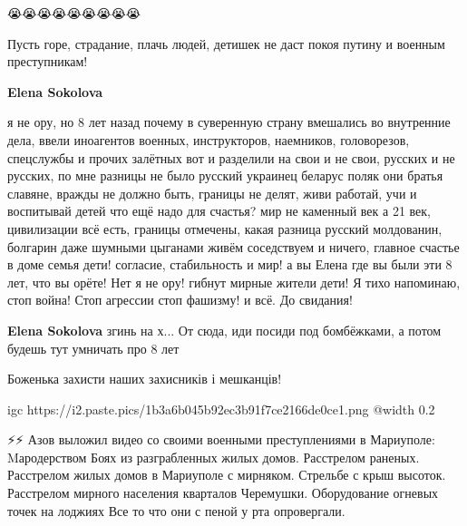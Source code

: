 😭😭😭😭😭😭😭😭😭


Пусть горе, страдание, плачь людей, детишек не даст покоя путину и военным преступникам!

\begin{itemize} %
\textbf{Elena Sokolova} 

я не ору, но 8 лет назад почему в суверенную страну вмешались во внутренние
дела, ввели иноагентов военных, инструкторов, наемников, головорезов,
спецслужбы и прочих залётных вот и разделили на свои и не свои, русских и не
русских, по мне разницы не было русский украинец беларус поляк они братья
славяне, вражды не должно быть, границы не делят, живи работай, учи и
воспитывай детей что ещё надо для счастья? мир не каменный век а 21 век,
цивилизации всё есть, границы отмечены, какая разница русский молдованин,
болгарин даже шумными цыганами живём соседствуем и ничего, главное счастье в
доме семья дети! согласие, стабильность и мир! а вы Елена где вы были эти 8
лет, что вы орёте! Нет я не ору! гибнут мирные жители дети! Я тихо напоминаю,
стоп война! Стоп агрессии стоп фашизму! и всё. До свидания!

\textbf{Elena Sokolova} згинь на х... От сюда, иди посиди под бомбёжками, а потом будешь тут умничать про 8 лет
\end{itemize} %


Боженька захисти наших захисників і мешканців!

\ifcmt
  igc https://i2.paste.pics/1b3a6b045b92ec3b91f7ce2166de0ce1.png
	@width 0.2
\fi


⚡️⚡️
\obeycr
Азов выложил видео со своими военными преступлениями в Мариуполе:
Mародерством
Боях из разграбленных жилых домов.
Расстрелом раненых.
Расстрелом жилых домов в Мариуполе с мирняком.
Стрельбе с крыш высоток.
Расстрелом мирного населения кварталов Черемушки.
Оборудование огневых точек на лоджиях
Все то что они с пеной у рта опровергали.
\restorecr

